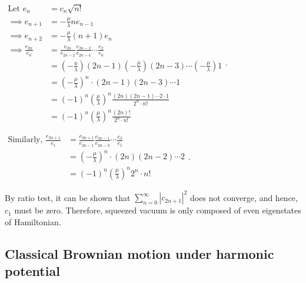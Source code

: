 \documentclass[12pt, twoside]{article}
\begin{document}
$\begin{aligned}\text{Let } e_n &= c_n \sqrt{n!} \\\implies e_{n+1} &= -\frac{\mu}{\lambda} n e_{n-1} \\\implies e_{n+2} &= -\frac{\mu}{\lambda} (n+1) e_n \\ \implies \frac { e_{2n} } { e _ { 0 } } &= \frac { e_{2n} } { e_{2n- 2} } \frac { e_{2n- 2} } { e_{2n- 4} } \cdots \frac { e _ { 2 } } { e _ { 0 } } \\ &= \left( - \frac { u } { \lambda } \right) { ( 2n - 1 ) } \left( - \frac { \mu } { \lambda } \right) ( 2n - 3 ) \cdots \left( - \frac { \mu } { \lambda } \right) 1 \\
  &= \left( -\frac { \mu } { \lambda } \right) ^ { n } \cdot ( 2 n - 1 ) ( 2 n - 3 ) \cdots 1 \\  &= ( - 1 ) ^ { n } \left( \frac { \mu } { \lambda } \right) ^ { n } \frac { ( 2 n ) ( 2 n - 1 ) \cdots 2\cdot1 } {2 ^ { n } \cdot n !  } \\ &= ( - 1 ) ^ { n } \left( \frac { \mu } { \lambda } \right) ^ { n } \frac { (2n)! } {2 ^ { n } \cdot n !  }  \end{aligned}$.
  
  $\begin{aligned}\text{Similarly, }\frac { e_{2n+1} } { e _ { 1 } } &= \frac { e_{2n+1} } { e_{2n-1} } \frac { e_{2n- 1} } { e_{2n- 3} } \cdots \frac { e _ { 3 } } { e _ { 1 } } \\
  &= \left( -\frac { \mu } { \lambda } \right) ^ { n } \cdot ( 2 n ) ( 2 n - 2) \cdots 2 \\  &= ( - 1 ) ^ { n } \left( \frac { \mu } { \lambda } \right) ^ { n } {2 ^ { n } \cdot n !  }\end{aligned}$.
  
  By ratio test, it can be shown that $\sum _ { n = 0 } ^ { \infty } |c_{2n+1}|^2$ does not converge, and hence, $c_1$ must be zero. Therefore, squeezed vacuum is only composed of even eigenstates of Hamiltonian.



\subsection{ Classical Brownian motion under harmonic potential}
\end{document}
